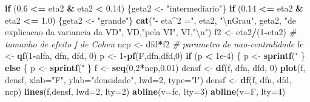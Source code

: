 \documentclass[]{article}
\newenvironment{Shaded}{\begin{snugshade}}{\end{snugshade}}
\newcommand{\KeywordTok}[1]{\textcolor[rgb]{0.13,0.29,0.53}{\textbf{#1}}}
\newcommand{\DataTypeTok}[1]{\textcolor[rgb]{0.13,0.29,0.53}{#1}}
\newcommand{\DecValTok}[1]{\textcolor[rgb]{0.00,0.00,0.81}{#1}}
\newcommand{\FloatTok}[1]{\textcolor[rgb]{0.00,0.00,0.81}{#1}}
\newcommand{\CharTok}[1]{\textcolor[rgb]{0.31,0.60,0.02}{#1}}
\newcommand{\StringTok}[1]{\textcolor[rgb]{0.31,0.60,0.02}{#1}}
\newcommand{\CommentTok}[1]{\textcolor[rgb]{0.56,0.35,0.01}{\textit{#1}}}
\newcommand{\ControlFlowTok}[1]{\textcolor[rgb]{0.13,0.29,0.53}{\textbf{#1}}}
\newcommand{\OperatorTok}[1]{\textcolor[rgb]{0.81,0.36,0.00}{\textbf{#1}}}
\newcommand{\NormalTok}[1]{#1}
\begin{document}
\begin{Shaded}
\begin{Highlighting}[]
{\ControlFlowTok{if}\NormalTok{ (}\FloatTok{0.6} \OperatorTok{<=}\StringTok{ }\NormalTok{eta2 }\OperatorTok{&}\StringTok{ }\NormalTok{eta2 }\OperatorTok{<}\StringTok{ }\FloatTok{0.14}\NormalTok{) \{geta2 <-}\StringTok{ "intermediario"}\NormalTok{\}}
\ControlFlowTok{if}\NormalTok{ (}\FloatTok{0.14} \OperatorTok{<=}\StringTok{ }\NormalTok{eta2 }\OperatorTok{&}\StringTok{ }\NormalTok{eta2 }\OperatorTok{<=}\StringTok{ }\FloatTok{1.0}\NormalTok{) \{geta2 <-}\StringTok{ "grande"}\NormalTok{\}}
\KeywordTok{cat}\NormalTok{(}\StringTok{"- eta^2 ="}\NormalTok{, eta2, }\StringTok{"}\CharTok{\textbackslash{}n}\StringTok{Grau"}\NormalTok{, geta2,}
    \StringTok{"de explicacao da variancia da VD"}\NormalTok{, VD,}\StringTok{"pela VI"}\NormalTok{, VI,}\StringTok{"}\CharTok{\textbackslash{}n}\StringTok{"}\NormalTok{)}
\NormalTok{f2 <-}\StringTok{ }\NormalTok{eta2}\OperatorTok{/}\NormalTok{(}\DecValTok{1}\OperatorTok{-}\NormalTok{eta2) }\CommentTok{# tamanho de efeito f de Cohen}
\NormalTok{ncp <-}\StringTok{ }\NormalTok{dfd}\OperatorTok{*}\NormalTok{f2 }\CommentTok{# parametro de nao-centralidade}
\NormalTok{fc <-}\StringTok{ }\KeywordTok{qf}\NormalTok{(}\DecValTok{1}\OperatorTok{-}\NormalTok{alfa, dfn, dfd, }\DecValTok{0}\NormalTok{)}
\NormalTok{p <-}\StringTok{ }\DecValTok{1}\OperatorTok{-}\KeywordTok{pf}\NormalTok{(F,dfn,dfd,}\DecValTok{0}\NormalTok{)}
\ControlFlowTok{if}\NormalTok{ (p }\OperatorTok{<}\StringTok{ }\FloatTok{1e-4}\NormalTok{)}
\NormalTok{\{}
\NormalTok{  p <-}\StringTok{ }\KeywordTok{sprintf}\NormalTok{(}\StringTok{"%.2e"}\NormalTok{,p)}
\NormalTok{\} }\ControlFlowTok{else}
\NormalTok{\{}
\NormalTok{  p <-}\StringTok{ }\KeywordTok{sprintf}\NormalTok{(}\StringTok{"%.4f"}\NormalTok{,p)}
\NormalTok{\}}
\NormalTok{f <-}\StringTok{ }\KeywordTok{seq}\NormalTok{(}\DecValTok{0}\NormalTok{,}\DecValTok{2}\OperatorTok{*}\NormalTok{ncp,}\FloatTok{0.01}\NormalTok{)}
\NormalTok{densf <-}\StringTok{ }\KeywordTok{df}\NormalTok{(f, dfn, dfd, }\DecValTok{0}\NormalTok{)}
\KeywordTok{plot}\NormalTok{(f, densf, }\DataTypeTok{xlab=}\StringTok{"F"}\NormalTok{, }\DataTypeTok{ylab=}\StringTok{"densidade"}\NormalTok{, }\DataTypeTok{lwd=}\DecValTok{2}\NormalTok{, }\DataTypeTok{type=}\StringTok{"l"}\NormalTok{)}
\NormalTok{densf <-}\StringTok{ }\KeywordTok{df}\NormalTok{(f, dfn, dfd, ncp)}
\KeywordTok{lines}\NormalTok{(f,densf, }\DataTypeTok{lwd=}\DecValTok{2}\NormalTok{, }\DataTypeTok{lty=}\DecValTok{2}\NormalTok{)}
\KeywordTok{abline}\NormalTok{(}\DataTypeTok{v=}\NormalTok{fc, }\DataTypeTok{lty=}\DecValTok{3}\NormalTok{)}
\KeywordTok{abline}\NormalTok{(}\DataTypeTok{v=}\NormalTok{F, }\DataTypeTok{lty=}\DecValTok{4}\NormalTok{)}
}}}
\end{Highlighting}
\end{Shaded}
\end{document}
